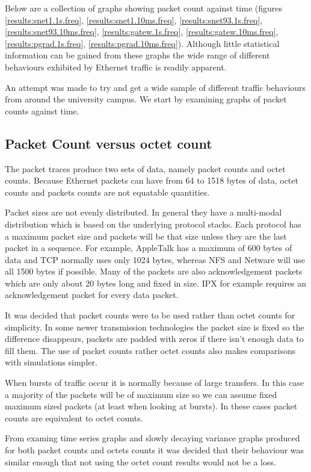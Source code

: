 Below are a collection of graphs showing packet count against time (figures 
\ref{results:snet1.1s.freq}, \ref{results:snet1.10ms.freq},
\ref{results:snet93.1s.freq}, \ref{results:snet93.10ms.freq},
\ref{results:gatew.1s.freq}, \ref{results:gatew.10ms.freq},
\ref{results:pgrad.1s.freq}, \ref{results:pgrad.10ms.freq}).
Although little statistical information can be gained from these
graphs the wide range of different behaviours exhibited by Ethernet
traffic is readily apparent.

An attempt was made to try and get a wide sample of different traffic
behaviours from around the university campus.  We start by examining
graphs of packet counts against time.

\subsection{Packet Count versus octet count}

The packet traces produce two sets of data, namely packet counts and
octet counts.  Because Ethernet packets can have from 64 to 1518 bytes
of data, octet counts and packets counts are not equatable quantities.

Packet sizes are not evenly distributed.  In general they have a
multi-modal distribution which is based on the underlying protocol
stacks.  Each protocol has a maximum packet size and packets will be
that size unless they are the last packet in a sequence.  For example,
AppleTalk has a maximum of 600 bytes of data and TCP normally uses
only 1024 bytes, whereas NFS and Netware will use all 1500 bytes if
possible.  Many of the packets are also acknowledgement packets which
are only about 20 bytes long and fixed in size.  IPX for example
requires an acknowledgement packet for every data packet.

It was decided that packet counts were to be used rather than octet
counts for simplicity.  In some newer transmission technologies the
packet size is fixed so the difference disappears, packets are padded
with zeros if there isn't enough data to fill them.  The use of packet
counts rather octet counts also makes comparisons with simulations
simpler.

When bursts of traffic occur it is normally because of large
transfers.  In this case a majority of the packets will be of maximum
size so we can assume fixed maximum sized packets (at least when
looking at bursts).  In these cases packet counts are equivalent to
octet counts.

From examing time series graphs and slowly decaying variance graphs
produced for both packet counts and octets counts it was decided that
their behaviour was similar enough that not using the octet count
results would not be a loss.

